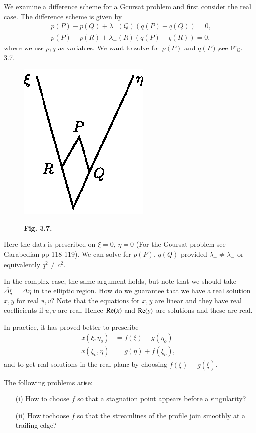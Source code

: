 We examine a difference scheme for a Goursat problem and first consider the real case. The difference scheme is given by 
\begin{align*}
& p(P) - p(Q) + \lambda_+ (Q) (q (P) - q(Q)) =0,\\
& p(P) - p (R) + \lambda_- (R) (q(P) - q(R))  = 0,
\end{align*}
where we use $p,q$ as variables. We want to solve for $p(P)$ and $q(P)$,\pageoriginale see Fig. 3.7.
\begin{figure}[H]
\centering
\includegraphics{figures/fig3.7.eps}
\centerline{\bf Fig. 3.7.}
\end{figure}

Here the data is prescribed on $\xi = 0$, $\eta = 0$ (For the Goursat problem see Garabedian \cite{key13} pp 118-119). We can solve for $p(P)$, $q(Q)$  provided $\lambda_+ \neq \lambda_-$ or equivalently $q^2 \neq c^2$. 

In the complex case, the same argument holds, but note that we should take $\overline{\Delta \xi} = \Delta \eta$ in the elliptic region. How do we guarantee that we have a real solution $x,y$ for real $u,v$? Note that the equations for $x,y$ are linear and they have real coefficients if $u,v$ are real. Hence $\operatorname{Re}(x)$ and $\operatorname{Re}(y)$ are solutions and these are real.

In practice, it has proved better to prescribe
\begin{align*}
x (\xi, \eta_o) & = f(\xi) + g(\eta_o)\\
x (\xi_o ,\eta) & = g(\eta) + f(\xi_o),
\end{align*}
and to get real solutions in the real plane by choosing $f(\xi) = \overline{g(\bar{\xi})}$.

The following problems arise:
\begin{itemize}
\item[{\rm (i)}] How to choose $f$ so that a stagnation point appears before a singularity? 

\item[{\rm (ii)}] How to\pageoriginale choose $f$ so that the streamlines of the profile join smooth\-ly at a trailing edge?
\end{itemize}


